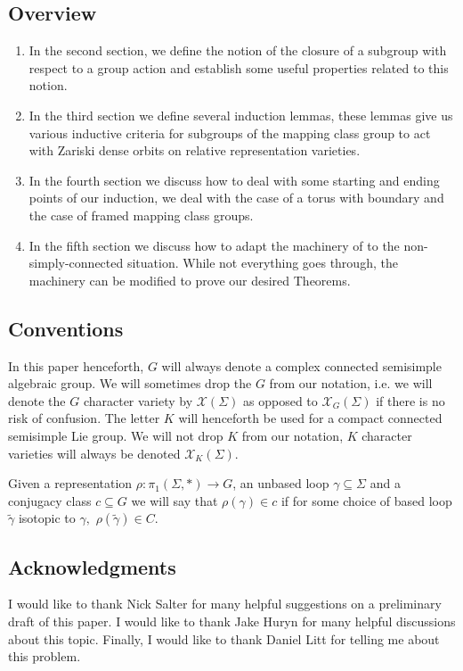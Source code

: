 \documentclass{article}
\newcommand{\XX}{\mathcal{X}}
\begin{document}
\subsection{Overview}
\begin{enumerate}
    \item In the second section, we define the notion of the closure of a subgroup with respect to a group action and establish some useful properties related to this notion.
    \item In the third section we define several induction lemmas, these lemmas give us various inductive criteria for subgroups of the mapping class group to act with Zariski dense orbits on relative representation varieties.
    \item In the fourth section we discuss how to deal with some starting and ending points of our induction, we deal with the case of a torus with boundary and the case of framed mapping class groups.
    \item In the fifth section we discuss how to adapt the machinery of \cite{BS} to the non-simply-connected situation. While not everything goes through, the machinery can be modified to prove our desired Theorems.
\end{enumerate}
\subsection{Conventions}
In this paper henceforth, $G$ will always denote a complex connected semisimple algebraic group. We will sometimes drop the $G$ from our notation, i.e. we will denote the $G$ character variety by $\XX(\Sigma)$ as opposed to $\XX_G(\Sigma)$ if there is no risk of confusion. 
The letter $K$ will henceforth be used for a compact connected semisimple Lie group.
We will not drop $K$ from our notation, $K$ character varieties will always be denoted $\XX_K(\Sigma).$

Given a representation $\rho: \pi_1(\Sigma, *) \to G$, an unbased loop $\gamma \subseteq \Sigma$ and a conjugacy class $c \subseteq G$ we will say that $\rho(\gamma) \in c$ if for some choice of based loop $\tilde \gamma$
 isotopic to $\gamma,$ $\rho(\tilde \gamma) \in C.$

\subsection{Acknowledgments}
I would like to thank Nick Salter for many helpful suggestions on a preliminary draft of this paper. I would like to thank Jake Huryn for many helpful discussions about this topic. Finally, I would like to thank Daniel Litt for telling me about this problem.
\end{document}
